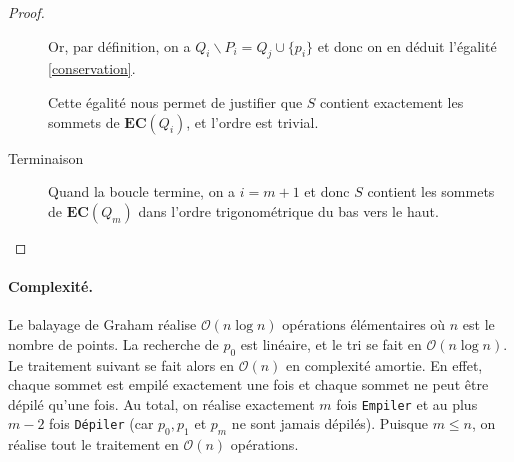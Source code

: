 \begin{proof}
\begin{description}
Or, par définition, on a $Q_i\backslash P_i = Q_j \cup \{p_i\}$ et donc on en déduit l'égalité \ref{conservation}.

Cette égalité nous permet de justifier que $S$ contient exactement les sommets de $\mathbf{EC}(Q_i)$, et l'ordre est trivial.

\item[Terminaison] Quand la boucle termine, on a $i=m+1$ et donc $S$ contient les sommets de $\mathbf{EC}(Q_m)$ dans l'ordre trigonométrique du bas vers le haut. 
\end{description}
\end{proof}

\paragraph{Complexité.} Le balayage de Graham réalise $\mathcal{O}(n \log n)$ opérations élémentaires où $n$ est le nombre de points. La recherche de $p_0$ est linéaire, et le tri se fait en $\mathcal{O}(n\log n)$. Le traitement suivant se fait alors en $\mathcal{O}(n)$ en complexité amortie. En effet, chaque sommet est empilé exactement une fois et chaque sommet ne peut être dépilé qu'une fois. Au total, on réalise exactement $m$ fois {\tt Empiler} et au plus $m-2$ fois {\tt Dépiler} (car $p_0,p_1$ et $p_m$ ne sont jamais dépilés). Puisque $m\leq n$, on réalise tout le traitement en $\mathcal{O}(n)$ opérations.

